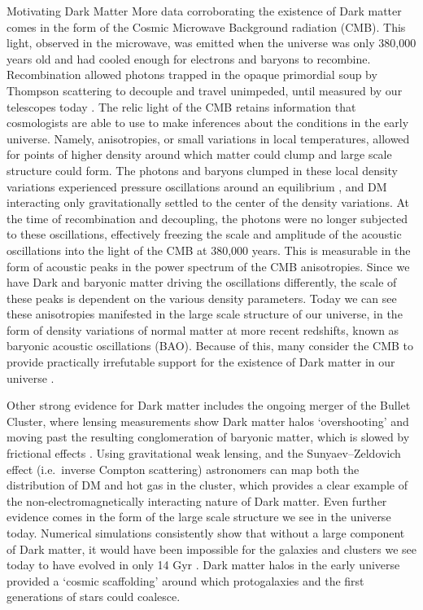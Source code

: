 \documentclass[a4paper,11pt]{article}
\begin{document}
\begin{section}{Motivating Dark Matter}
    More data corroborating the existence of Dark matter comes in the form of the Cosmic Microwave Background radiation (CMB).
    This light, observed in the microwave, was emitted when the universe was only 380,000 years old and had cooled enough for electrons and baryons to recombine.
    Recombination allowed photons trapped in the opaque primordial soup by Thompson scattering to decouple and travel unimpeded, until measured by our telescopes today \cite{Bertone:2018}.
    The relic light of the CMB retains information that cosmologists are able to use to make inferences about the conditions in the early universe. Namely, anisotropies, or small variations in local temperatures, allowed for points of higher density around which matter could clump and large scale structure could form.
    The photons and baryons clumped in these local density variations experienced pressure oscillations around an equilibrium \cite{Eisenstein:2005}, and DM interacting only gravitationally settled to the center of the density variations.
    At the time of recombination and decoupling, the photons were no longer subjected to these oscillations, effectively freezing the scale and amplitude of the acoustic oscillations into the light of the CMB at 380,000 years.
    This is measurable in the form of acoustic peaks in the power spectrum of the CMB anisotropies. 
    Since we have Dark and baryonic matter driving the oscillations differently, the scale of these peaks is dependent on the various density parameters.
    Today we can see these anisotropies manifested in the large scale structure of our universe, in the form of density variations of normal matter at more recent redshifts, known as baryonic acoustic oscillations (BAO).
    Because of this, many consider the CMB to provide practically irrefutable support for the existence of Dark matter in our universe \cite{Freese:2017dm}.

    Other strong evidence for Dark matter includes the ongoing merger of the Bullet Cluster, where lensing measurements show Dark matter halos `overshooting' and moving past the resulting conglomeration of baryonic matter, which is slowed by frictional effects \cite{Clowe:2004}.
    Using gravitational weak lensing, and the Sunyaev–Zeldovich effect (i.e.~inverse Compton scattering) astronomers can map both the distribution of DM and hot gas in the cluster, which provides a clear example of the non-electromagnetically interacting nature of Dark matter.
    Even further evidence comes in the form of the large scale structure we see in the universe today.
    Numerical simulations consistently show that without a large component of Dark matter, it would have been impossible for the galaxies and clusters we see today to have evolved in only 14 Gyr \cite{Springel:2005}.
    Dark matter halos in the early universe provided a `cosmic scaffolding' around which protogalaxies and the first generations of stars could coalesce. 


\end{section}
\end{document}
